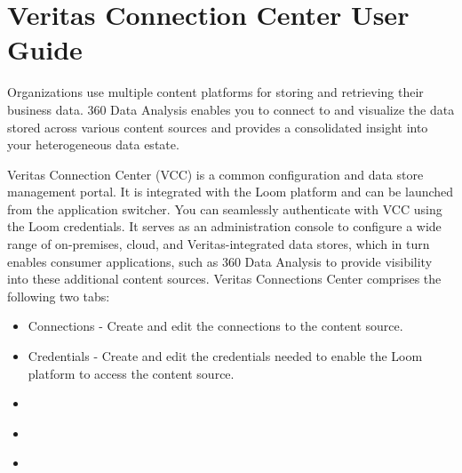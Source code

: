 \documentclass[letterpaper,10pt,english]{sphinxmanual}
\begin{document}
\chapter{Veritas Connection Center User Guide}
\label{\detokenize{mcdmp_app_ug:veritas-connection-center-user-guide}}
Organizations use multiple content platforms for storing and retrieving their business data. 360 Data Analysis enables you to connect to and visualize the data stored across various content sources and provides a consolidated insight into your heterogeneous data estate.

Veritas Connection Center (VCC) is a common configuration and data store management portal. It is integrated with the Loom platform and can be launched from the application switcher. You can seamlessly authenticate with VCC using the Loom credentials. It serves as an administration console to configure a wide range of on-premises, cloud, and Veritas-integrated data stores, which in turn enables consumer applications, such as 360 Data Analysis to provide visibility into these additional content sources. Veritas Connections Center comprises the following two tabs:
\begin{itemize}
\item {} 
Connections - Create and edit the connections to the content source.

\item {} 
Credentials - Create and edit the credentials needed to enable the Loom platform to access the content source.

\end{itemize}

\begin{figure}[htbp]
\centering

\noindent{}
\end{figure}

\begin{sphinxShadowBox}
\begin{itemize}
\item {} 
\label{\detokenize{mcdmp_app_ug:id17}}{\hyperref[\detokenize{mcdmp_app_ug:getting-started-with-veritas-connection-center}]{}}

\item {} 
\label{\detokenize{mcdmp_app_ug:id18}}{\hyperref[\detokenize{mcdmp_app_ug:configuring-on-cloud-content-sources}]{}}

\item {} 
\label{\detokenize{mcdmp_app_ug:id19}}{\hyperref[\detokenize{mcdmp_app_ug:configuring-on-premises-content-sources}]{}}

\end{itemize}
\end{sphinxShadowBox}
\end{document}
